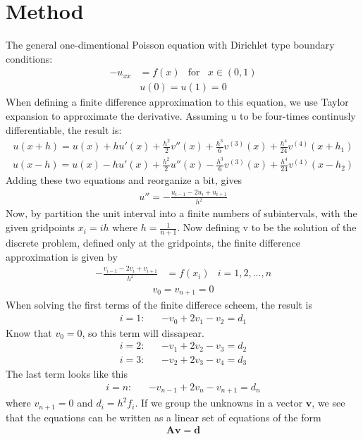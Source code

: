\documentclass[norsk]{article}
\begin{document}
\section{Method}
The general one-dimentional Poisson equation with Dirichlet type boundary conditions:
\begin{align}
{-u_{xx}} &= f(x)
& \text{for}    
& x \in(0,1)
\end{align}
\begin{align}
{u(0)=u(1)=0}
\end{align}
When defining a finite difference approximation to this equation, we use Taylor expansion to approximate the derivative. Assuming u to be four-times continusly differentiable, the result is: 
\begin{align}
{u(x+h)=u(x)+hu'(x)+\frac{h^2}{2}v''(x)+\frac{h^3}{6}v^{(3)}(x)+\frac{h^4}{24}v^{(4)}(x+h_1)} 
\end{align}
\begin{align}
{u(x-h)=u(x)-hu'(x)+\frac{h^2}{2}u''(x)-\frac{h^3}{6}v^{(3)}(x)+\frac{h^4}{24}v^{(4)}(x-h_2)}
\end{align} 
Adding these two equations and reorganize a bit, gives
\begin{align}
{u''=-\frac{u_{i-1}-2u_{i}+u_{i+1}}{h^2}}
\end{align}
Now, by partition the unit interval into a finite numbers of subintervals, with the given gridpoints $x_{i}=ih$ where $h=\frac{1}{n+1}$. Now defining v to be the solution of the discrete problem, defined only at the gridpoints, the finite difference approximation is given by
\begin{align}
{-\frac{v_{i-1}-2v_{i}+v_{i+1}}{h^2}} &= {f(x_{i})}
& i=1,2,...,n
\end{align}
\begin{align}
{v_{0}=v_{n+1}=0}
\end{align}
When solving the first terms of the finite differece scheem, the result is
\begin{align}
{i=1:} &
& {-v_0 + 2v_1 -v_2=d_1}
\end{align}
Know that $v_0=0$, so this term will dissapear.
\begin{align}
{i=2:} &
& {-v_1+2v_2-v_3=d_2}
\end{align}
\begin{align}
{i=3:} &
& {-v_2+2v_3-v_4=d_3}
\end{align}
The last term looks like this
\begin{align}
{i=n:} &
& {-v_{n-1}+2v_n-v_{n+1}=d_n}
\end{align} 
where $v_{n+1}=0$ and $d_i=h^2f_i$.
If we group the unknowns in a vector $\mathbf{v}$, we see that the equations can be written as a linear set of equations of the form
\begin{align}
{\mathbf{Av}=\mathbf{d}}
\end{align}
\end{document}
